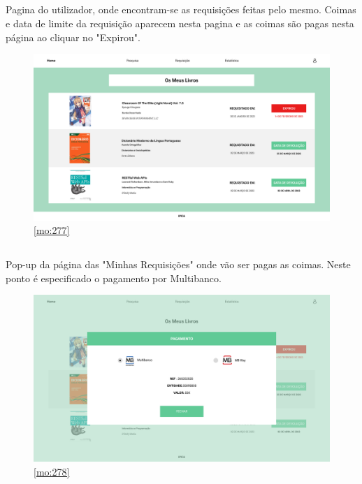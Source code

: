 \newpage

\subsection{}

Pagina do utilizador, onde encontram-se as requisições feitas pelo mesmo. Coimas e data de limite da requisição aparecem nesta pagina e as coimas são pagas nesta página ao cliquar no "Expirou".

\begin{figure}[H]
	\centering
	\includegraphics[width=1\linewidth]{../Mockups/PNGs/Minhas Requisicoes.png}  %
	\caption{\ref{mo:277}}
	\label{fig:chap277}
\end{figure}


\newpage

\subsection{}

Pop-up da página das "Minhas Requisições" onde vão ser pagas as coimas. Neste ponto é especificado o pagamento por Multibanco.

\begin{figure}[H]
	\centering
	\includegraphics[width=1\linewidth]{../Mockups/PNGs/Pagamento de coimas Multibanco.png}  %
	\caption{\ref{mo:278}}
	\label{fig:chap278}
\end{figure}


